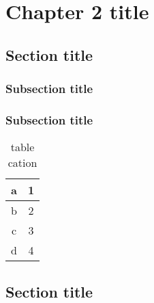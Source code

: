 \chapter{Chapter 2 title}
\section{Section title} 
\blindtext

\subsection{Subsection title}
\blindtext
\subsection{Subsection title}
\blindtext
\begin{table}[h]
	\centering
	\caption{table cation}
	\begin{tabu}{|c|c|}
		\hline 
	a	& 1   \\ \hline 
	b	&  2\\ \hline 
	c	&   3 \\ \hline 
	d	& 4\\
	\hline
	\end{tabu}
\end{table}
\section{Section title} 
\blindtext